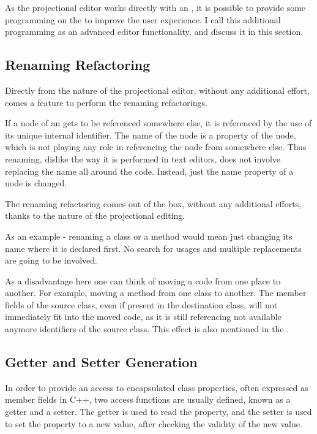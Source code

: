 
As the projectional editor works directly with an  , it is possible to provide some programming on the 
 to improve the user experience. I call this additional programming as an advanced editor functionality, and 
discuss it in this section.

\subsection{Renaming Refactoring}
Directly from the nature of the projectional editor, without any additional effort, comes a feature to 
perform the renaming refactorings.

If a node of an  gets to be referenced somewhere else, it is referenced by the use of its unique internal
identifier. The name of the node is a property of the node, which is not playing any role in
referencing the node from somewhere else. Thus renaming, dislike the way it is performed in text
editors, does not involve replacing the name all around the code. Instead, just the name property 
of a node is changed.

The renaming refactoring comes out of the box, without any additional efforts, thanks to the nature of the
projectional editing.

As an example - renaming a class or a method would mean just changing its name where it is declared first.
No search for usages and multiple replacements are going to be involved.

As a disadvantage here one can think of moving a code from one place to another. For example, moving 
a method from one class to another. The member fields of the source class, even if present in the destination
class, will not immediately fit into the moved code, as it is still referencing not available anymore
identifiers of the source class. This effect is also mentioned in the .


\subsection{Getter and Setter Generation}
\label{getterandsetter}

In order to provide an access to encapsulated class properties, often expressed as member fields in C++, 
two access functions are usually defined, known as a getter and a setter. The getter is used to read the property,
and the setter is used to set the property to a new value, after checking the validity of the new value.

